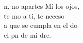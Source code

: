 \begin{cancion}%
	n, no apartes  Mí los ojos,\\
	te mo a ti, te neceso\\
	a que se cumpla en el do\\
	el pn de mi dre.\\
\end{cancion}%
